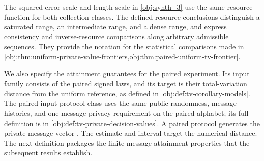 \documentclass[11pt]{article}
\begin{document}
The squared-error scale  and length scale  in \cref{obj:synth_3} use the same resource function for both collection classes. The defined resource conclusions distinguish a saturated range, an intermediate range, and a dense range, and express consistency and inverse-resource comparisons along arbitrary admissible sequences. They provide the notation for the statistical comparisons made in \cref{obj:thm:uniform-private-value-frontiers,obj:thm:paired-uniform-tv-frontier}.

We also specify the attainment guarantees for the paired experiment. Its input family  consists of the paired signed laws, and its target  is their total-variation distance from the uniform reference, as defined in \cref{obj:def:tv-corollary-models}. The paired-input protocol class  uses the same public randomness, message histories, and one-message privacy requirement on the paired alphabet; its full definition is in \cref{obj:def:tv-private-decision-values}. A paired protocol  generates the private message vector . The estimate  and interval  target the numerical distance. The next definition packages the finite-message attainment properties that the subsequent results establish.
\end{document}
